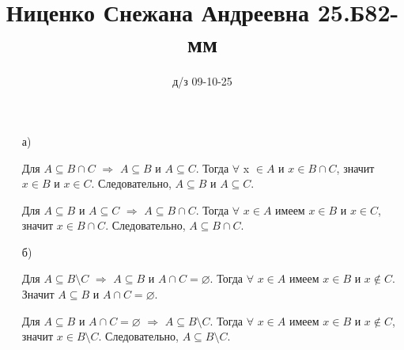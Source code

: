 \documentclass{article}
\title{Ниценко Снежана Андреевна 25.Б82-мм}
\author{д/з 09-10-25}
\date{}
\begin{document}
\maketitle


\begin{solution}[1.1]
\begin{enumerate}
    \item[а)] 
    
    Для $A \subseteq B \cap C$ $\Rightarrow$ $A \subseteq B$ и $A \subseteq C$. Тогда $\forall$ x $\in A$ и $x \in B \cap C$, значит $x \in B$ и $x \in C$. Следовательно, $A \subseteq B$ и $A \subseteq C$.
    
    Для $A \subseteq B$ и $A \subseteq C$ $\Rightarrow$ $A \subseteq B \cap C$. Тогда $\forall$ $x \in A$ имеем $x \in B$ и $x \in C$, значит $x \in B \cap C$. Следовательно, $A \subseteq B \cap C$.
    
    \item[б)] 
    
    Для $A \subseteq B \setminus C$ $\Rightarrow$ $A \subseteq B$ и $A \cap C = \varnothing$. Тогда $\forall$ $x \in A$ имеем $x \in B$ и $x \notin C$. Значит $A \subseteq B$ и $A \cap C = \varnothing$.
    
    Для $A \subseteq B$ и $A \cap C = \varnothing$ $\Rightarrow$ $A \subseteq B \setminus C$. Тогда $\forall$ $x \in A$ имеем $x \in B$ и $x \notin C$, значит $x \in B \setminus C$. Следовательно, $A \subseteq B \setminus C$.
\end{enumerate}
\end{solution}
\end{document}
